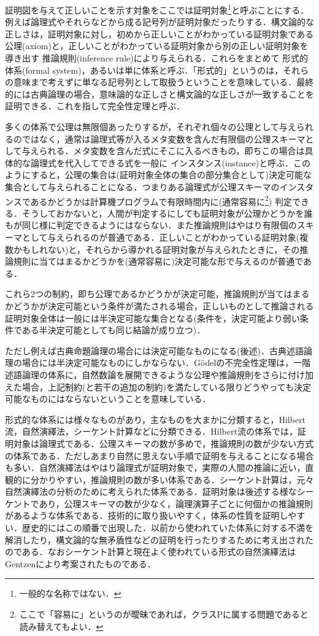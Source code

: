 \documentclass{ltjsarticle}
\theoremstyle{mystyle1}
\theoremstyle{mystyle2}
\newcommand{\red}[1]{{\color{red} #1}}
\begin{document}
証明図を与えて正しいことを示す対象をここでは証明対象\footnote{一般的な名称ではない．}と呼ぶことにする．例えば論理式やそれらなどから成る記号列が証明対象だったりする．構文論的な正しさは，証明対象に対し，初めから正しいことがわかっている証明対象である\red{公理}(axiom)と，正しいことがわかっている証明対象から別の正しい証明対象を導き出す\red{推論規則}(inference rule)により与えられる．これらをまとめて\red{形式的体系}(formal system)，あるいは単に体系と呼ぶ．「形式的」というのは，それらの意味まで考えずに単なる記号列として取扱うということを意味している．最終的には古典論理の場合，意味論的な正しさと構文論的な正しさが一致することを証明できる．これを指して完全性定理と呼ぶ．

多くの体系で公理は無限個あったりするが，それぞれ個々の公理として与えられるのではなく，通常は論理式等が入るメタ変数を含んだ有限個の公理スキーマとして与えられる．メタ変数を含んだ式にそこに入るべきもの，即ちこの場合は具体的な論理式を代入してできる式を一般に\red{インスタンス}(instance)と呼ぶ．このようにすると，公理の集合は(証明対象全体の集合の部分集合として)決定可能な集合として与えられることになる．つまりある論理式が公理スキーマのインスタンスであるかどうかは計算機プログラムで有限時間内に(通常容易に\footnote{ここで「容易に」というのが曖昧であれば，クラスPに属する問題であると読み替えてもよい．}) 判定できる．そうしておかないと，人間が判定するにしても証明対象が公理かどうかを誰もが同じ様に判定できるようにはならない．また推論規則はやはり有限個のスキーマとして与えられるのが普通である．正しいことがわかっている証明対象(複数かもしれない)と，それらから導かれる証明対象が与えられたときに，その推論規則に当てはまるかどうかを(通常容易に)決定可能な形で与えるのが普通である．

これら2つの制約，即ち公理であるかどうかが決定可能，推論規則が当てはまるかどうかが決定可能という条件が満たされる場合，正しいものとして推論される証明対象全体は一般には半決定可能な集合となる(条件を，決定可能より弱い条件である半決定可能としても同じ結論が成り立つ)．

ただし例えば古典命題論理の場合には決定可能なものになる(後述)．古典述語論理の場合には半決定可能なものにしかならない．G\"{o}delの不完全性定理は，一階述語論理の体系に，自然数論を展開できるような公理や推論規則をさらに付け加えた場合，上記制約(と若干の追加の制約)を満たしている限りどうやっても決定可能なものにはならないということを意味している．

形式的な体系には様々なものがあり，主なものを大まかに分類すると，Hilbert流，自然演繹法，シーケント計算などに分類できる．Hilbert流の体系では，証明対象は論理式である．公理スキーマの数が多めで，推論規則の数が少ない方式の体系である．ただしあまり自然に思えない手順で証明を与えることになる場合も多い．自然演繹法はやはり論理式が証明対象で，実際の人間の推論に近い，直観的に分かりやすい，推論規則の数が多い体系である．シーケント計算は，元々自然演繹法の分析のために考えられた体系である．証明対象は後述する様なシーケントであり，公理スキーマの数が少なく，論理演算子ごとに何個かの推論規則があるような体系である．技術的に取り扱いやすく，体系の性質を証明しやすい．歴史的にはこの順番で出現した．以前から使われていた体系に対する不満を解消したり，構文論的な無矛盾性などの証明を行ったりするために考え出されたのである．なおシーケント計算と現在よく使われている形式の自然演繹法はGentzenにより考案されたものである．
\end{document}
